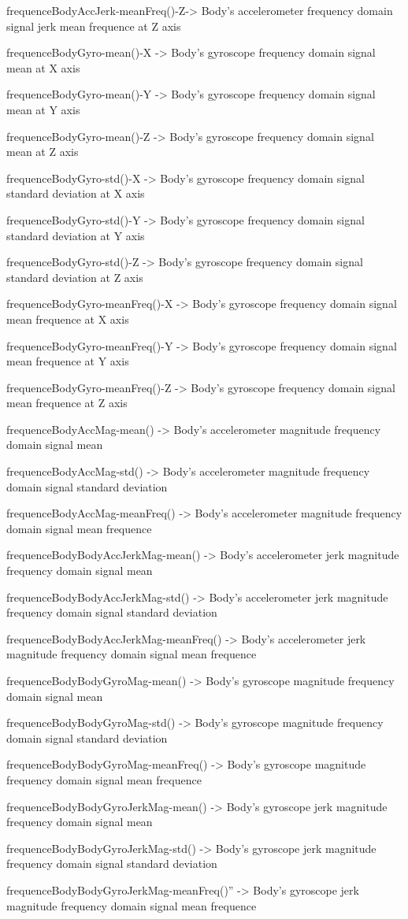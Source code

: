 \documentclass[
]{article}
\begin{document}
frequenceBodyAccJerk-meanFreq()-Z-\textgreater{} Body's accelerometer
frequency domain signal jerk mean frequence at Z axis

frequenceBodyGyro-mean()-X -\textgreater{} Body's gyroscope frequency
domain signal mean at X axis

frequenceBodyGyro-mean()-Y -\textgreater{} Body's gyroscope frequency
domain signal mean at Y axis

frequenceBodyGyro-mean()-Z -\textgreater{} Body's gyroscope frequency
domain signal mean at Z axis

frequenceBodyGyro-std()-X -\textgreater{} Body's gyroscope frequency
domain signal standard deviation at X axis

frequenceBodyGyro-std()-Y -\textgreater{} Body's gyroscope frequency
domain signal standard deviation at Y axis

frequenceBodyGyro-std()-Z -\textgreater{} Body's gyroscope frequency
domain signal standard deviation at Z axis

frequenceBodyGyro-meanFreq()-X -\textgreater{} Body's gyroscope
frequency domain signal mean frequence at X axis

frequenceBodyGyro-meanFreq()-Y -\textgreater{} Body's gyroscope
frequency domain signal mean frequence at Y axis

frequenceBodyGyro-meanFreq()-Z -\textgreater{} Body's gyroscope
frequency domain signal mean frequence at Z axis

frequenceBodyAccMag-mean() -\textgreater{} Body's accelerometer
magnitude frequency domain signal mean

frequenceBodyAccMag-std() -\textgreater{} Body's accelerometer magnitude
frequency domain signal standard deviation

frequenceBodyAccMag-meanFreq() -\textgreater{} Body's accelerometer
magnitude frequency domain signal mean frequence

frequenceBodyBodyAccJerkMag-mean() -\textgreater{} Body's accelerometer
jerk magnitude frequency domain signal mean

frequenceBodyBodyAccJerkMag-std() -\textgreater{} Body's accelerometer
jerk magnitude frequency domain signal standard deviation

frequenceBodyBodyAccJerkMag-meanFreq() -\textgreater{} Body's
accelerometer jerk magnitude frequency domain signal mean frequence

frequenceBodyBodyGyroMag-mean() -\textgreater{} Body's gyroscope
magnitude frequency domain signal mean

frequenceBodyBodyGyroMag-std() -\textgreater{} Body's gyroscope
magnitude frequency domain signal standard deviation

frequenceBodyBodyGyroMag-meanFreq() -\textgreater{} Body's gyroscope
magnitude frequency domain signal mean frequence

frequenceBodyBodyGyroJerkMag-mean() -\textgreater{} Body's gyroscope
jerk magnitude frequency domain signal mean

frequenceBodyBodyGyroJerkMag-std() -\textgreater{} Body's gyroscope jerk
magnitude frequency domain signal standard deviation

frequenceBodyBodyGyroJerkMag-meanFreq()'' -\textgreater{} Body's
gyroscope jerk magnitude frequency domain signal mean frequence
\end{document}
